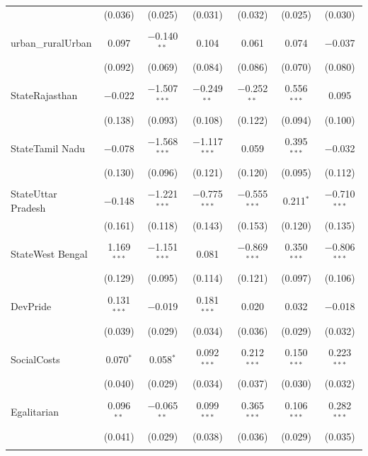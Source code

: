 \documentclass[
]{article}
\begin{document}
\begin{landscape}
\begin{table}[!htbp]
\begin{tabular}{@{\extracolsep{5pt}}lcccccc}
  & (0.036) & (0.025) & (0.031) & (0.032) & (0.025) & (0.030) \\ 
  & & & & & & \\ 
 urban\_ruralUrban & 0.097 & $-$0.140$^{**}$ & 0.104 & 0.061 & 0.074 & $-$0.037 \\ 
  & (0.092) & (0.069) & (0.084) & (0.086) & (0.070) & (0.080) \\ 
  & & & & & & \\ 
 StateRajasthan & $-$0.022 & $-$1.507$^{***}$ & $-$0.249$^{**}$ & $-$0.252$^{**}$ & 0.556$^{***}$ & 0.095 \\ 
  & (0.138) & (0.093) & (0.108) & (0.122) & (0.094) & (0.100) \\ 
  & & & & & & \\ 
 StateTamil Nadu & $-$0.078 & $-$1.568$^{***}$ & $-$1.117$^{***}$ & 0.059 & 0.395$^{***}$ & $-$0.032 \\ 
  & (0.130) & (0.096) & (0.121) & (0.120) & (0.095) & (0.112) \\ 
  & & & & & & \\ 
 StateUttar Pradesh & $-$0.148 & $-$1.221$^{***}$ & $-$0.775$^{***}$ & $-$0.555$^{***}$ & 0.211$^{*}$ & $-$0.710$^{***}$ \\ 
  & (0.161) & (0.118) & (0.143) & (0.153) & (0.120) & (0.135) \\ 
  & & & & & & \\ 
 StateWest Bengal & 1.169$^{***}$ & $-$1.151$^{***}$ & 0.081 & $-$0.869$^{***}$ & 0.350$^{***}$ & $-$0.806$^{***}$ \\ 
  & (0.129) & (0.095) & (0.114) & (0.121) & (0.097) & (0.106) \\ 
  & & & & & & \\ 
 DevPride & 0.131$^{***}$ & $-$0.019 & 0.181$^{***}$ & 0.020 & 0.032 & $-$0.018 \\ 
  & (0.039) & (0.029) & (0.034) & (0.036) & (0.029) & (0.032) \\ 
  & & & & & & \\ 
 SocialCosts & 0.070$^{*}$ & 0.058$^{*}$ & 0.092$^{***}$ & 0.212$^{***}$ & 0.150$^{***}$ & 0.223$^{***}$ \\ 
  & (0.040) & (0.029) & (0.034) & (0.037) & (0.030) & (0.032) \\ 
  & & & & & & \\ 
 Egalitarian & 0.096$^{**}$ & $-$0.065$^{**}$ & 0.099$^{***}$ & 0.365$^{***}$ & 0.106$^{***}$ & 0.282$^{***}$ \\ 
  & (0.041) & (0.029) & (0.038) & (0.036) & (0.029) & (0.035) \\ 
  & & & & & & \\ 

\end{tabular}
\end{table}
\end{landscape}
\end{document}
